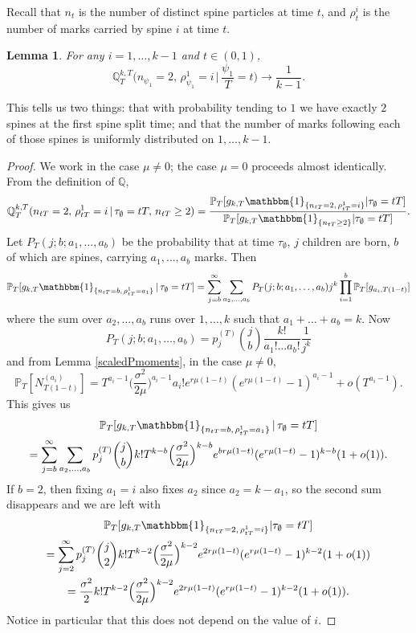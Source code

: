 \documentclass{article}
\theoremstyle{plain}
\newtheorem{lem}[thm]{Lemma}
\theoremstyle{definition}
\newcommand{\Q}{\mathbb{Q}}
\renewcommand{\P}{\mathbb{P}}
\newcommand{\ind}{\mathbbm{1}}
\begin{document}
Recall that $n_t$ is the number of distinct spine particles at time $t$, and $\rho^i_t$ is the number of marks carried by spine $i$ at time $t$.

\begin{lem}\label{splitsdistinct}
For any $i=1,\ldots,k-1$ and $t\in(0,1)$,
\[\Q^{k,T}_T\Big(n_{\psi_1} = 2, \, \rho^1_{\psi_1} = i \,\Big|\, \frac{\psi_1}{T} = t\Big) \to \frac{1}{k-1}.\]
\end{lem}

This tells us two things: that with probability tending to $1$ we have exactly $2$ spines at the first spine split time; and that the number of marks following each of those spines is uniformly distributed on $1,\ldots,k-1$.

\begin{proof}
We work in the case $\mu\neq 0$; the case $\mu=0$ proceeds almost identically. From the definition of $\Q$,
\[\Q^{k,T}_T(n_{tT} =2, \, \rho^1_{tT}=i\, |\, \tau_\emptyset = tT,\, n_{tT} \ge 2) = \frac{\P_T[g_{k,T} \ind_{\{n_{tT} =2, \, \rho^1_{tT}=i\}} | \tau_\emptyset = tT]}{\P_T[g_{k,T} \ind_{\{n_{tT}\ge 2\}} | \tau_\emptyset = tT]}.\]
Let $P_T(j;b;a_1,\ldots,a_b)$ be the probability that at time $\tau_\emptyset$, $j$ children are born, $b$ of which are spines, carrying $a_1,\ldots,a_b$ marks. Then
\[\P_T[g_{k,T} \ind_{\{n_{tT}= b,\, \rho^1_{tT}=a_1\}} \,|\, \tau_\emptyset = tT] = \sum_{j=b}^\infty \sum_{a_2,\ldots,a_b} P_T(j;b;a_1,\ldots,a_b) j^k \prod_{i=1}^b \P_T[g_{a_i,T(1-t)}]\]
where the sum over $a_2,\ldots,a_b$ runs over $1,\ldots,k$ such that $a_1+\ldots+a_b=k$.
Now
\[P_T(j;b;a_1,\ldots,a_b) = p_j^{(T)} \binom{j}{b} \frac{k!}{a_1!\ldots a_b!} \frac{1}{j^k}\]
and from Lemma \ref{scaledPmoments}, in the case $\mu\neq 0$,
\[\P_T[N_{T(1-t)}^{(a_i)}] = T^{a_i-1} \Big( \frac{\sigma^2}{2\mu} \Big)^{a_i-1} a_i! e^{r\mu (1-t)} ( e^{r\mu (1-t)} - 1 )^{a_i-1} + o(T^{a_i-1}).\]
This gives us
\begin{multline*}
\P_T[g_{k,T} \ind_{\{n_{tT}=b,\, \rho^1_{tT}=a_1\}}\, |\, \tau_\emptyset = tT] \\
= \sum_{j=b}^\infty  \sum_{a_2,\ldots,a_b} p_j^{(T)} \binom{j}{b} k! T^{k-b}\Big(\frac{\sigma^2}{2\mu}\Big)^{k-b} e^{br\mu(1-t)}(e^{r\mu(1-t)}-1)^{k-b}(1+o(1)).
\end{multline*}
If $b=2$, then fixing $a_1=i$ also fixes $a_2$ since $a_2=k-a_1$, so the second sum disappears and we are left with
\begin{multline}
\P_T[g_{k,T} \ind_{\{n_{tT}= 2,\, \rho^1_{tT}=i\}} | \tau_\emptyset = tT] \\
= \sum_{j=2}^\infty p_j^{(T)} \binom{j}{2} k! T^{k-2}\Big(\frac{\sigma^2}{2\mu}\Big)^{k-2} e^{2r\mu(1-t)}(e^{r\mu(1-t)}-1)^{k-2}(1+o(1))\\
= \frac{\sigma^2}{2} k! T^{k-2}\Big(\frac{\sigma^2}{2\mu}\Big)^{k-2} e^{2r\mu(1-t)}(e^{r\mu(1-t)}-1)^{k-2}(1+o(1)).\label{l2case}
\end{multline}
Notice in particular that this does not depend on the value of $i$.


\end{proof}
\end{document}
